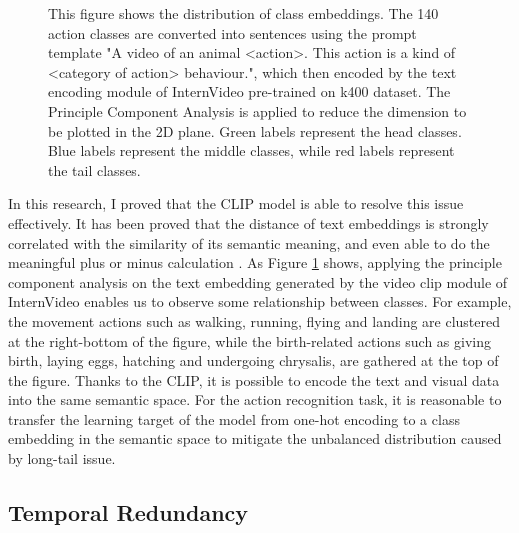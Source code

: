 \begin{figure}[ht]
    \centering
    \caption[Class Embedding Distribution]{This figure shows the distribution of class embeddings. The 140 action classes are converted into sentences using the prompt template "A video of an animal <action>. This action is a kind of <category of action> behaviour.", which then encoded by the text encoding module of InternVideo \parencite{wang2022internvideo} pre-trained on k400 dataset. The Principle Component Analysis is applied to reduce the dimension to be plotted in the 2D plane. Green labels represent the head classes. Blue labels represent the middle classes, while red labels represent the tail classes.}
    \label{fig:1_1_ClassEmbeddingInternVideo}
\end{figure}



In this research, I proved that the CLIP model is able to resolve this issue effectively. It has been proved that the distance of text embeddings is strongly correlated with the similarity of its semantic meaning, and even able to do the meaningful plus or minus calculation \parencite{mikolov2013efficient}. As Figure \ref{fig:1_1_ClassEmbeddingInternVideo} shows, applying the principle component analysis on the text embedding generated by the video clip module of InternVideo \parencite{wang2022internvideo} enables us to observe some relationship between classes. For example, the movement actions such as walking, running, flying and landing are clustered at the right-bottom of the figure, while the birth-related actions such as giving birth, laying eggs, hatching and undergoing chrysalis, are gathered at the top of the figure. Thanks to the CLIP, it is possible to encode the text and visual data into the same semantic space. For the action recognition task, it is reasonable to transfer the learning target of the model from one-hot encoding to a class embedding in the semantic space \parencite{ma2022x} to mitigate the unbalanced distribution caused by long-tail issue. 

\subsection{Temporal Redundancy}


